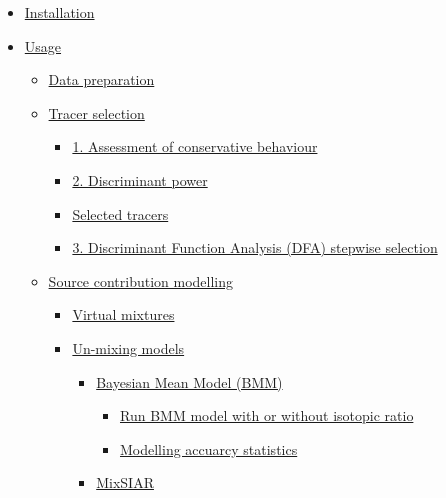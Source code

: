 \documentclass[
]{article}
\providecommand{\tightlist}{%
  \setlength{\itemsep}{0pt}\setlength{\parskip}{0pt}}
\begin{document}
\begin{itemize}
\tightlist
\item
  \protect\hyperlink{installation}{Installation}
\item
  \protect\hyperlink{usage}{Usage}

  \begin{itemize}
  \tightlist
  \item
    \protect\hyperlink{data-preparation}{Data preparation}
  \item
    \protect\hyperlink{tracer-selection}{Tracer selection}

    \begin{itemize}
    \tightlist
    \item
      \protect\hyperlink{1-assessment-of-conservative-behaviour}{1.
      Assessment of conservative behaviour}
    \item
      \protect\hyperlink{2-discriminant-power}{2. Discriminant power}
    \item
      \protect\hyperlink{selected-tracers}{Selected tracers}
    \item
      \protect\hyperlink{3-discriminant-function-analysis-dfa-stepwise-selection}{3.
      Discriminant Function Analysis (DFA) stepwise selection}
    \end{itemize}
  \item
    \protect\hyperlink{source-contribution-modelling}{Source
    contribution modelling}

    \begin{itemize}
    \tightlist
    \item
      \protect\hyperlink{virtual-mixtures}{Virtual mixtures}
    \item
      \protect\hyperlink{un-mixing-models}{Un-mixing models}

      \begin{itemize}
      \tightlist
      \item
        \protect\hyperlink{bayesian-mean-model-bmm}{Bayesian Mean Model
        (BMM)}

        \begin{itemize}
        \tightlist
        \item
          \protect\hyperlink{run-bmm-model-with-or-without_isotopic-ratio}{Run
          BMM model with or without isotopic ratio}
        \item
          \protect\hyperlink{modelling-accuracy-statistics}{Modelling
          accuarcy statistics}
        \end{itemize}
      \item
        \protect\hyperlink{mixsiar}{MixSIAR}


\end{itemize}
\end{itemize}
\end{itemize}
\end{itemize}
\end{document}
